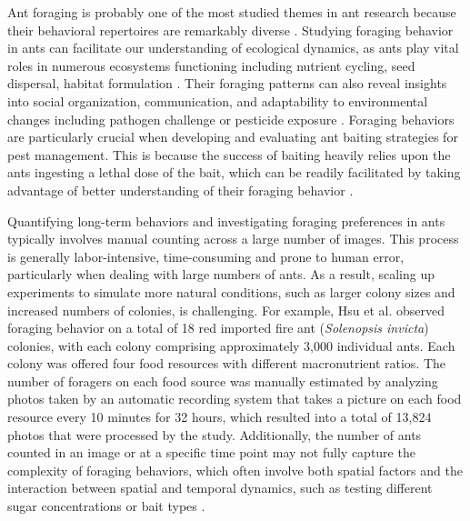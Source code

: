 Ant foraging is probably one of the most studied themes in ant research because their behavioral repertoires are remarkably diverse \cite{reeves_evolution_2019}. Studying foraging behavior in ants can facilitate our understanding of ecological dynamics, as ants play vital roles in numerous ecosystems functioning including nutrient cycling, seed dispersal, habitat formulation \cite{parr_response_2022, rocha_two_2024}. Their foraging patterns can also reveal insights into social organization, communication, and adaptability to environmental changes including pathogen challenge \cite{alciatore_immune_2021} or pesticide exposure \cite{thiel_sublethal_2016}. Foraging behaviors are particularly crucial when developing and evaluating ant baiting strategies for pest management. This is because the success of baiting heavily relies upon the ants ingesting a lethal dose of the bait, which can be readily facilitated by taking advantage of better understanding of their foraging behavior \cite{galante_acute_2024}.

Quantifying long-term behaviors and investigating foraging preferences in ants typically involves manual counting across a large number of images. This process is generally labor-intensive, time-consuming and prone to human error, particularly when dealing with large numbers of ants. As a result, scaling up experiments to simulate more natural conditions, such as larger colony sizes and increased numbers of colonies, is challenging. For example, Hsu et al. \cite{hsu_viral_2018} observed foraging behavior on a total of 18 red imported fire ant (\emph{Solenopsis invicta}) colonies, with each colony comprising approximately 3,000 individual ants. Each colony was offered four food resources with different macronutrient ratios. The number of foragers on each food source was manually estimated by analyzing photos taken by an automatic recording system that takes a picture on each food resource every 10 minutes for 32 hours, which resulted into a total of 13,824 photos that were processed by the study. Additionally, the number of ants counted in an image or at a specific time point may not fully capture the complexity of foraging behaviors, which often involve both spatial factors and the interaction between spatial and temporal dynamics, such as testing different sugar concentrations \cite{sola_feeding_2016} or bait types \cite{du_foraging_2023}. 
    
